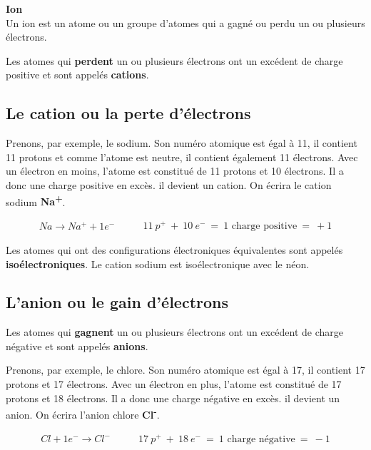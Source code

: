 \documentclass[
  11pt,
  a4paper,
  openany]{book}
\begin{document}
\begin{tcolorbox}
\textbf{Ion}\\
Un ion est un atome ou un groupe d'atomes qui a gagné ou perdu un ou plusieurs électrons.

\end{tcolorbox}

Les atomes qui \textbf{perdent} un ou plusieurs électrons ont un excédent de charge positive et sont appelés \textbf{cations}.

\subsection{Le cation ou la perte d'électrons}\label{le-cation-ou-la-perte-duxe9lectrons}

Prenons, par exemple, le sodium. Son numéro atomique est égal à 11, il contient 11 protons et comme l'atome est neutre, il contient également 11 électrons. Avec un électron en moins, l'atome est constitué de 11 protons et 10 électrons. Il a donc une charge positive en excès. il devient un cation. On écrira le cation sodium \textbf{Na\textsuperscript{+}}.

\[ \begin{split}
        Na \rightarrow Na^+ + 1e^-
    \end{split}
    \qquad
    \begin{split}
        11\:p^{+}\:+\:10\:e^{-}\:=\:\text{1 charge positive}\:=\:+1
    \end{split} \]

Les atomes qui ont des configurations électroniques équivalentes sont appelés \textbf{isoélectroniques}. Le cation sodium est isoélectronique avec le néon.

\subsection{L'anion ou le gain d'électrons}\label{lanion-ou-le-gain-duxe9lectrons}

Les atomes qui \textbf{gagnent} un ou plusieurs électrons ont un excédent de charge négative et sont appelés \textbf{anions}.

Prenons, par exemple, le chlore. Son numéro atomique est égal à 17, il contient 17 protons et 17 électrons. Avec un électron en plus, l'atome est constitué de 17 protons et 18 électrons. Il a donc une charge négative en excès. il devient un anion. On écrira l'anion chlore \textbf{Cl\textsuperscript{-}}.

\[ \begin{split}
        Cl + 1e^- \rightarrow Cl^-
    \end{split}
    \qquad
    \begin{split}
        17\:p^{+}\:+\:18\:e^{-}\:=\:\text{1 charge négative}\:=\: -1
    \end{split} \]
\end{document}
